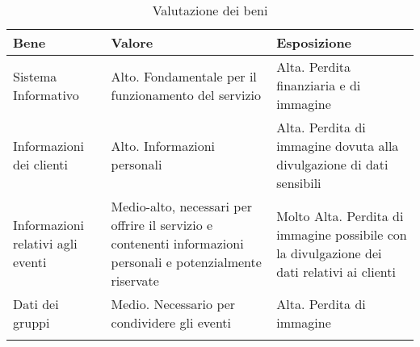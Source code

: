 \begin{longtable} {|P{3.5cm}|P{5.5cm}|P{6.7cm}|}
    \hline
    \textbf{Bene}                     & \textbf{Valore}                                                                                              & \textbf{Esposizione}      \\
    \hline
    Sistema Informativo               & Alto. Fondamentale per il funzionamento del servizio                                                         &
    Alta. Perdita finanziaria e di immagine                                                                                                                                      \\
    \hline
    Informazioni dei clienti          & Alto. Informazioni personali                                                                                 &
    Alta. Perdita di immagine dovuta alla divulgazione
    di dati sensibili                                                                                                                                                            \\
    \hline
    Informazioni relativi agli eventi & Medio-alto, necessari per offrire il servizio e contenenti informazioni personali e potenzialmente riservate &
    Molto Alta. Perdita di immagine possibile con la divulgazione dei dati relativi ai
    clienti                                                                                                                                                                      \\
    \hline
    Dati dei gruppi                   & Medio. Necessario per condividere gli eventi                                                                 & Alta. Perdita di immagine \\
    \hline
    \caption{Valutazione dei beni}
\end{longtable}

\clearpage

